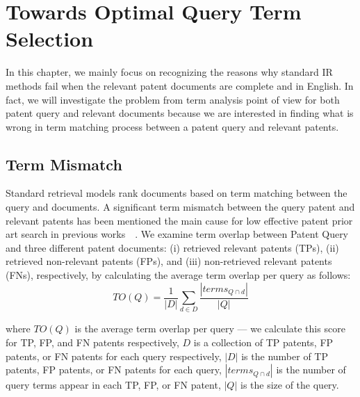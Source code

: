 \chapter{Towards Optimal Query Term Selection}
\label{cha:analysis}
In this chapter, we mainly focus on recognizing the reasons why standard IR methods fail when the relevant patent documents are complete and in English. In fact, we will investigate the problem from term analysis point of view for both patent query and relevant documents because we are interested in finding what is wrong in term matching process between a patent query and relevant patents. 


\section{Term Mismatch}
\label{sec:termmismatch}
%
Standard retrieval models rank documents based on term matching between the query and documents.  
A significant term mismatch between the query patent and relevant patents has been mentioned the
main cause for low effective patent prior art search in previous works~\citep{roda2010clef}~\citep{magdy2012toward}. 
We examine term overlap between Patent Query and three different patent documents: (i) retrieved relevant patents (TPs), (ii) retrieved non-relevant patents (FPs), and (iii) non-retrieved relevant patents (FNs), respectively, by calculating the average term overlap per query as follows:
\begin{equation} 
TO (Q) = \frac{1}{|D|}\sum_{d\in D}\frac{|terms_{Q\cap d}|}{|Q|}
\label{eq:fntermoverlap}
\end{equation}

where $TO(Q)$ is the average term overlap per query --- we calculate this score for TP, FP, and FN patents respectively, $D$ is a collection of TP patents, FP patents, or FN patents for each query respectively, $|D|$ is the number of TP patents, FP patents, or FN patents for each query, $ |terms_{Q\cap d}| $ is the number of query terms appear in each TP, FP, or FN patent, $ |Q| $ is the size of the query.

